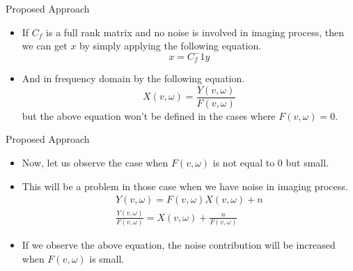 \documentclass{beamer}
\begin{document}
\begin{frame}{Proposed Approach}
  \begin{itemize}
  \item {
   If $C_f$ is a full rank matrix and no noise is involved in imaging process, then we can get $x$ by simply applying the following equation.
\begin{equation}
x = C_f^-1y
\end{equation} 
    \pause %
  }
  \item {   
    And in frequency domain by the following equation.
\begin{equation}
X(v,\omega) = \frac{Y(v,\omega)}{F(v,\omega)}
\end{equation}
but the above equation won't be defined in the cases where $F(v,\omega) = 0$. 
  }
  \end{itemize}
\end{frame}

\begin{frame}{Proposed Approach}
  \begin{itemize}
  \item {
   Now, let us observe the case when $F(v,\omega)$ is not equal to $0$ but small. 
    \pause %
  }
  \item {   
    This will be a problem in those case when we have noise in imaging process.
\begin{eqnarray}
Y(v,\omega) = F(v,\omega)X(v,\omega) + n\\
\frac{Y(v,\omega)}{F(v,\omega)} = X(v,\omega) + \frac{n}{F(v,\omega)}
\end{eqnarray}
\pause
  }
  \item {
  	If we observe the above equation, the noise contribution will be increased when $F(v,\omega)$ is small.
  }
  \end{itemize}
\end{frame}
\end{document}
